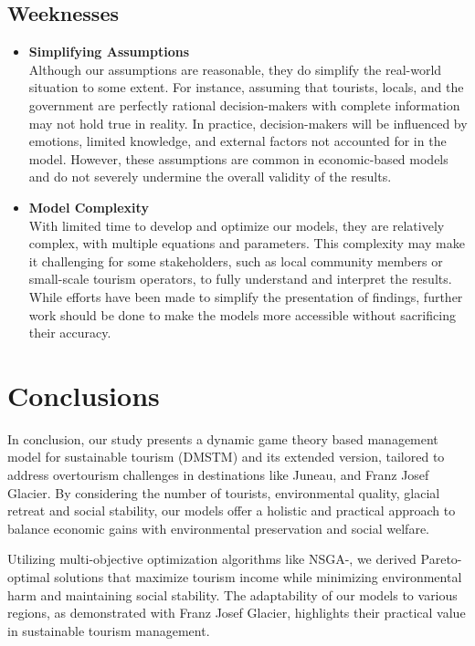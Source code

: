 \documentclass{mcmthesis}
\begin{document}
\subsection{Weeknesses}
\begin{itemize}
 \item \textbf{Simplifying Assumptions} \\
 Although our assumptions are reasonable, they do simplify the real-world situation to some extent.
 For instance, assuming that tourists, locals, and the government are perfectly rational decision-makers with complete information may not hold true in reality.
 In practice, decision-makers will be influenced by emotions, limited knowledge, and external factors not accounted for in the model.
 However, these assumptions are common in economic-based models and do not severely undermine the overall validity of the results.
 \item \textbf{Model Complexity} \\
 With limited time to develop and optimize our models, they are relatively complex, with multiple equations and parameters.
 This complexity may make it challenging for some stakeholders, such as local community members or small-scale tourism operators,
 to fully understand and interpret the results.
 While efforts have been made to simplify the presentation of findings, 
 further work should be done to make the models more accessible without sacrificing their accuracy.
\end{itemize}

\section{Conclusions}
In conclusion, our study presents a dynamic game theory based management model for sustainable tourism (DMSTM) and its extended version, 
tailored to address overtourism challenges in destinations like Juneau, and Franz Josef Glacier. 
By considering the number of tourists, environmental quality, glacial retreat and social stability,
our models offer a holistic and practical approach to balance economic gains with environmental preservation and social welfare.

Utilizing multi-objective optimization algorithms like NSGA-\uppercase\expandafter{}, 
we derived Pareto-optimal solutions that maximize tourism income while minimizing environmental harm and maintaining social stability.
The adaptability of our models to various regions, as demonstrated with Franz Josef Glacier, highlights their practical value in sustainable tourism management.
\end{document}
